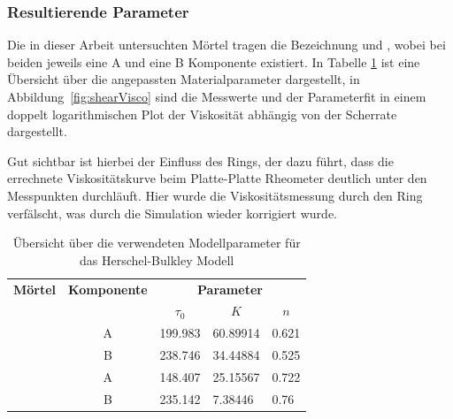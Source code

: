 \subsubsection{Resultierende Parameter}
Die in dieser Arbeit untersuchten Mörtel tragen die Bezeichnung \moertelA{} und \moertelB{}, wobei bei beiden jeweils eine A und eine B Komponente exis\-tiert. %
In Tabelle \ref{fig:resultParameter} ist eine Übersicht über die angepassten Materialparameter dargestellt, in Abbildung~\ref{fig:shearVisco} sind die Messwerte und der Parameterfit in einem doppelt logarithmischen Plot der Viskosität abhängig von der Scherrate dargestellt.

Gut sichtbar ist hierbei der Einfluss des Rings, der dazu führt, dass die errechnete Viskositätskurve beim Platte-Platte Rheometer deutlich unter den Messpunkten durchläuft.
Hier wurde die Viskositätsmessung durch den Ring verfälscht, was durch die Simulation wieder korrigiert wurde.
\begin{table}
    \centering
    \begin{tabular}{l c l l l}
        \toprule[1.5pt]
        \textbf{Mörtel} & \textbf{Komponente} & \multicolumn{3}{c}{\textbf{Parameter}} \\
        & &
        \multicolumn{1}{c}{$\tau_0$} &
        \multicolumn{1}{c}{$K$} &
        \multicolumn{1}{c}{$n$} \\
        \cmidrule(lr){3-5}
        \multirow{2}{*}{\moertelA{}} & A & 199.983 & 60.89914 & 0.621 \\ 
                                & B & 238.746 & 34.44884 & 0.525 \\ 
        \addlinespace
        \multirow{2}{*}{\moertelB{}}  & A & 148.407 & 25.15567 & 0.722 \\ 
                                & B & 235.142 & 7.38446  & 0.76  \\
        \bottomrule[1.5pt]
    \end{tabular}
    \caption{Übersicht über die verwendeten Modellparameter für das Herschel-Bulkley Modell}
    \label{fig:resultParameter}
\end{table}
%
